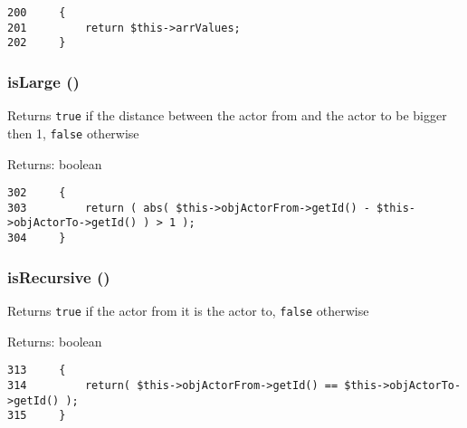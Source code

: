 \begin{Code}\begin{verbatim}200     {
201         return $this->arrValues;
202     }
\end{verbatim}
\end{Code}


\hypertarget{class_xml_sequence_message_1d7efe7edac17270d4af8dafe8e950ef}{
\subsubsection[{isLarge}]{\setlength{\rightskip}{0pt plus 5cm}isLarge ()}}
\label{class_xml_sequence_message_1d7efe7edac17270d4af8dafe8e950ef}


Returns {\tt true} if the distance between the actor from and the actor to be bigger then 1, {\tt false} otherwise

\begin{Desc}
\item[Returns:]boolean \end{Desc}


\begin{Code}\begin{verbatim}302     {
303         return ( abs( $this->objActorFrom->getId() - $this->objActorTo->getId() ) > 1 );
304     }
\end{verbatim}
\end{Code}


\hypertarget{class_xml_sequence_message_aa472e233121aa79f3c5c1298b4bc7cb}{
\subsubsection[{isRecursive}]{\setlength{\rightskip}{0pt plus 5cm}isRecursive ()}}
\label{class_xml_sequence_message_aa472e233121aa79f3c5c1298b4bc7cb}


Returns {\tt true} if the actor from it is the actor to, {\tt false} otherwise

\begin{Desc}
\item[Returns:]boolean \end{Desc}


\begin{Code}\begin{verbatim}313     {
314         return( $this->objActorFrom->getId() == $this->objActorTo->getId() );
315     }
\end{verbatim}
\end{Code}



